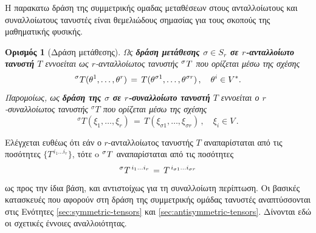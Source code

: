 \documentclass[11pt,a4paper,twoside,openright]{book}
\newtheorem{definition}[lemma]{Ορισμός}
\begin{document}
Η παρακατω δράση της συμμετρικής ομαδας μεταθέσεων στους ανταλλοίωτους και συναλλοίωτους τανυστές είναι θεμελιώδους σημασίας για τους σκοπούς της μαθηματικής φυσικής.
\begin{definition}[Δράση μετάθεσης]
	\label{def:permutation-action}
Ως \textbf{δράση μετάθεσης $\sigma \in S_r$ σε $r$-ανταλλοίωτο τανυστή} $Τ$ εννοείται ως $r$-ανταλλοίωτος τανυστής ${}^\sigma\hspace{.25pt}{T}$ που ορίζεται μέσω της σχέσης
\begin{equation}\label{eq:permutation-action-contravariant-tensor}
{}^\sigma\hspace{.25pt}{T}(\theta^1, \dots, \theta^r)
\,=\,
T(\theta^{\sigma 1}, \dots, \theta^{\sigma r})\,,
\quad
\theta^i \in V^*.
\end{equation}
Παρομοίως, ως \textbf{δράση της $\sigma$ σε $r$-συναλλοίωτο τανυστή} $Τ$ εννοείται ο $r$-συναλλοίωτος τανυστής ${}^\sigma\hspace{0pt}{Τ}$ που ορίζεται μέσω της σχέσης
\begin{equation}\label{eq:permutation-action-covariant-tensor}
{}^\sigma\hspace{0pt}{Τ}(\xi_1, \dots, \xi_r)
\,=\,
Τ(\xi_{\sigma 1}, \dots, \xi_{\sigma r})\,,
\quad
\xi_i \in V\,.
\end{equation}
\end{definition}
\noindent
Ελέγχεται ευθέως ότι εάν ο $r$-ανταλλοίωτος τανυστής $Τ$ αναπαρίσταται από τις ποσότητες $\{T^{\,i_1 \dots i_r}\}$, τότε o ${}^\sigma\hspace{.25pt}{T}$ αναπαρίσταται από τις ποσότητες
\begin{equation}\label{eq:permutation-action-contravariant-representation}
{}^\sigma\hspace{.25pt}T^{\,i_1 \dots i_r}
\,=\,
T^{\,i_{\sigma 1} \dots i_{\sigma r}}
\end{equation}
ως προς την ίδια βάση,
και αντιστοίχως για τη συναλλοίωτη περίπτωση.
Οι βασικές κατασκευές που αφορούν στη δράση της συμμετρικής ομάδας τανυστές αναπτύσσονται στις Ενότητες \ref{sec:symmetric-tensors} και \ref{sec:antisymmetric-tensors}.
Δίνονται εδώ οι σχετικές έννοιες αναλλοιότητας.
\end{document}
